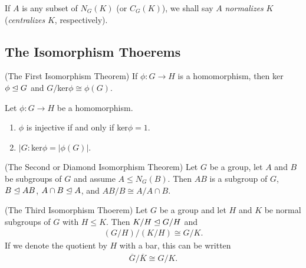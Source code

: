 \documentclass[../main]{subfiles}
\begin{document}
  
  \begin{dfn}
   If $A$ is any subset of $N_G(K)$ (or $C_G(K)$), we shall say $A$ \textit{normalizes} $K$ (\textit{centralizes} $K$, respectively).
  \end{dfn}
  
  
  \subsection{The Isomorphism Thoerems}
  
  
  \begin{thm}
   (The First Isomorphism Theorem) If $\phi \colon G\to H$ is a homomorphism, then ker$\phi \trianglelefteq G$ and $G/$ker$\phi \cong \phi(G)$.
  \end{thm}
  
  
  \begin{cor}
   Let $\phi \colon G\to H$ be a homomorphism.
   \begin{enumerate}
    \item $\phi$ is injective if and only if ker$\phi = 1$.
    \item $|G:$ker$\phi = |\phi(G)|$.
   \end{enumerate}
  \end{cor}
  
  
  \begin{thm}
   (The Second or Diamond Isomorphism Theorem) Let $G$ be a group, let $A$ and $B$ be subgroups of $G$ and assume $A\leq N_G(B)$. Then $AB$ is a subgroup of $G$, $B \trianglelefteq AB$, $A \cap B \trianglelefteq A$, and $AB/B \cong A/A\cap B$.
  \end{thm}
  
  
  \begin{thm}
   (The Third Isomorphism Thoerem) Let $G$ be a group and let $H$ and $K$ be normal subgroups of $G$ with $H\leq K$. Then $K/H \trianglelefteq G/H$ and 
   \begin{align*}
    (G/H)/(K/H) \cong G/K.
   \end{align*}
   If we denote the quotient by $H$ with a bar, this can be written
   \begin{align*}
    \overline{G}/\overline{K} \cong G/K.
   \end{align*}
  \end{thm}
  
\end{document}

